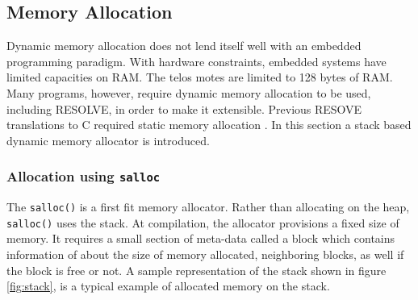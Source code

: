 







\subsection{Memory Allocation}

Dynamic memory allocation does not lend itself well with an embedded programming paradigm. With hardware constraints, embedded systems have limited capacities on RAM. The telos motes are limited to 128 bytes of RAM. Many programs, however, require dynamic memory allocation to be used, including RESOLVE, in order to make it extensible. Previous RESOVE translations to C required static memory allocation \cite{regula:2010}. In this section a stack based dynamic memory allocator is introduced.

\subsubsection{Allocation using \texttt{salloc}}

The \texttt{salloc()} is a first fit memory allocator. Rather than allocating on the heap, \texttt{salloc()} uses the stack. At compilation, the allocator provisions a fixed size of memory. It requires a small section of meta-data called a block which contains information of about the size of memory allocated, neighboring blocks, as well if the block is free or not. A sample representation of the stack shown in figure \ref{fig:stack}, is a typical example of allocated memory on the stack.

